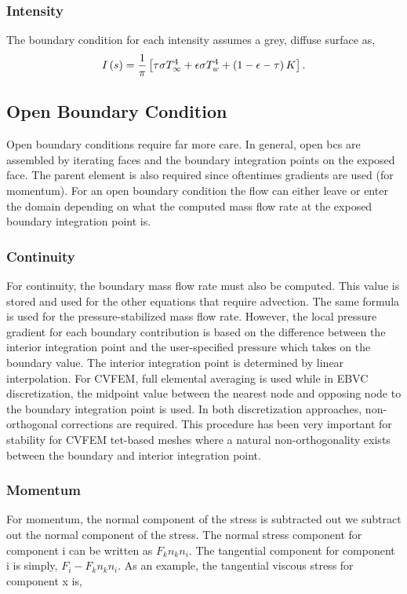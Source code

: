 \subsubsection{Intensity}
The boundary condition for each intensity assumes a grey, diffuse surface as, 
\begin{equation}
  I\left(s\right) = {1 \over \pi} \left[ \tau \sigma T_\infty^4 
                  + \epsilon \sigma T_w^4
                  + \left(1 - \epsilon - \tau \right) K \right].
\label{intBc}
\end{equation}

\subsection{Open Boundary Condition}
Open boundary conditions require far more care. In general,
open bcs are assembled by iterating faces and the boundary integration
points on the exposed face. The parent element is also required
since oftentimes gradients are used (for momentum). For an open boundary condition
the flow can either leave or enter the domain depending on what the computed mass
flow rate at the exposed boundary integration point is.

\subsubsection{Continuity}
For continuity, the boundary mass flow rate must also be computed. This value is stored and used
for the other equations that require advection. The same formula is used for the pressure-stabilized 
mass flow rate. However, the local pressure gradient
for each boundary contribution is based on the difference between the interior integration
point and the user-specified pressure which takes on the boundary value. The interior integration 
point is determined by linear interpolation. For CVFEM, full elemental averaging is used while in EBVC discretization,
the midpoint value between the nearest node and opposing node to the boundary integration point is used. In both
discretization approaches, non-orthogonal corrections are required. This procedure has been very important for 
stability for CVFEM tet-based meshes where a natural non-orthogonality exists between the boundary and
interior integration point.

\subsubsection{Momentum}
For momentum, the normal component of the stress is subtracted out we subtract out the normal component of the stress. The normal stress
component for component i can be written as $F_k n_k n_i$. The tangential 
component for component i is simply, $F_i - F_k n_k n_i$. As an example, the tangential
viscous stress for component x is,

